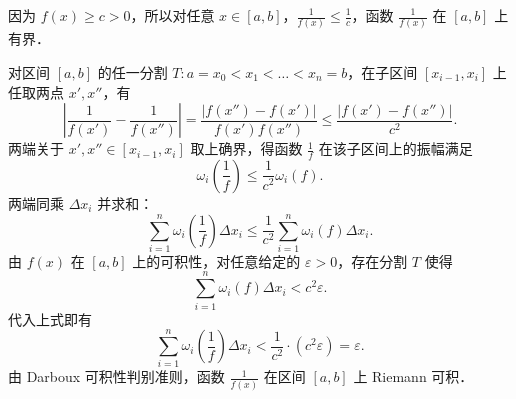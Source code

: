 \begin{myproof}
    因为 $f(x) \geqslant c > 0$，所以对任意 $x \in [a, b]$，$\frac{1}{f(x)} \leqslant \frac{1}{c}$，函数 $\frac{1}{f(x)}$ 在 $[a, b]$ 上有界．

    对区间 $[a, b]$ 的任一分割 $T : a = x_0 < x_1 < \dots < x_n = b$，在子区间 $[x_{i-1}, x_i]$ 上任取两点 $x', x''$，有
    \begin{equation}
        \left| \frac{1}{f(x')} - \frac{1}{f(x'')} \right| = \frac{|f(x'') - f(x')|}{f(x') f(x'')} \leqslant \frac{|f(x') - f(x'')|}{c^2}.
    \end{equation}
    两端关于 $x', x'' \in [x_{i-1}, x_i]$ 取上确界，得函数 $\frac{1}{f}$ 在该子区间上的振幅满足
    \begin{equation}
        \omega_i\left( \frac{1}{f} \right) \leqslant \frac{1}{c^2} \omega_i(f).
    \end{equation}
    两端同乘 $\Delta x_i$ 并求和：
    \begin{equation}
        \sum_{i=1}^n \omega_i\left( \frac{1}{f} \right) \Delta x_i \leqslant \frac{1}{c^2} \sum_{i=1}^n \omega_i(f) \Delta x_i.
    \end{equation}
    由 $f(x)$ 在 $[a, b]$ 上的可积性，对任意给定的 $\varepsilon > 0$，存在分割 $T$ 使得
    \begin{equation}
        \sum_{i=1}^n \omega_i(f) \Delta x_i < c^2 \varepsilon.
    \end{equation}
    代入上式即有
    \begin{equation}
        \sum_{i=1}^n \omega_i\left( \frac{1}{f} \right) \Delta x_i < \frac{1}{c^2} \cdot (c^2 \varepsilon) = \varepsilon.
    \end{equation}
    由 Darboux 可积性判别准则，函数 $\frac{1}{f(x)}$ 在区间 $[a, b]$ 上 Riemann 可积．
\end{myproof}

\endinput
